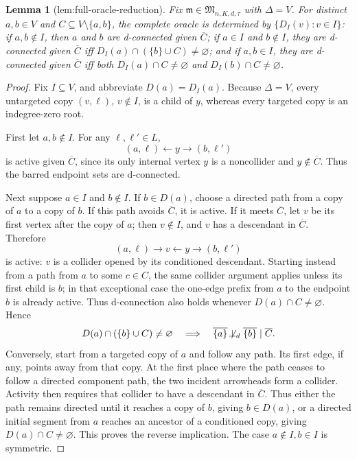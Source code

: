 \documentclass{article}
\newtheorem{lemma}{Lemma}
\begin{document}
\begin{lemma}[lem:full-oracle-reduction]\label{lem:full-oracle-reduction}
Fix \(\mathfrak m\in\mathfrak M_{n,K,d,\tau}\) with \(\Delta=V\). For distinct \(a,b\in V\) and \(C\subseteq V\setminus\{a,b\}\), the complete oracle is determined by \(\{D_I(v):v\in I\}\): if \(a,b\notin I\), then \(a\) and \(b\) are d-connected given \(\overline C\); if \(a\in I\) and \(b\notin I\), they are d-connected given \(\overline C\) iff \(D_I(a)\cap(\{b\}\cup C)\ne\varnothing\); and if \(a,b\in I\), they are d-connected given \(\overline C\) iff both \(D_I(a)\cap C\ne\varnothing\) and \(D_I(b)\cap C\ne\varnothing\).
\end{lemma}
\begin{proof}
Fix \(I\subseteq V\), and abbreviate \(D(a)=D_I(a)\). Because \(\Delta=V\), every untargeted copy \((v,\ell)\), \(v\notin I\), is a child of \(y\), whereas every targeted copy is an indegree-zero root.

First let \(a,b\notin I\). For any \(\ell,\ell'\in L\),
\[
 (a,\ell)\leftarrow y\to(b,\ell')
\]
is active given \(\overline C\), since its only internal vertex \(y\) is a noncollider and \(y\notin\overline C\). Thus the barred endpoint sets are d-connected.

Next suppose \(a\in I\) and \(b\notin I\). If \(b\in D(a)\), choose a directed path from a copy of \(a\) to a copy of \(b\). If this path avoids \(\overline C\), it is active. If it meets \(\overline C\), let \(v\) be its first vertex after the copy of \(a\); then \(v\notin I\), and \(v\) has a descendant in \(\overline C\). Therefore
\[
 (a,\ell)\to v\leftarrow y\to(b,\ell')
\]
is active: \(v\) is a collider opened by its conditioned descendant. Starting instead from a path from \(a\) to some \(c\in C\), the same collider argument applies unless its first child is \(b\); in that exceptional case the one-edge prefix from \(a\) to the endpoint \(b\) is already active. Thus d-connection also holds whenever \(D(a)\cap C\ne\varnothing\). Hence
\[
 D(a)\cap(\{b\}\cup C)\ne\varnothing
 \quad\Longrightarrow\quad
 \overline{\{a\}}\not\!\perp_d\overline{\{b\}}\mid\overline C.
\]
Conversely, start from a targeted copy of \(a\) and follow any path. Its first edge, if any, points away from that copy. At the first place where the path ceases to follow a directed component path, the two incident arrowheads form a collider. Activity then requires that collider to have a descendant in \(\overline C\). Thus either the path remains directed until it reaches a copy of \(b\), giving \(b\in D(a)\), or a directed initial segment from \(a\) reaches an ancestor of a conditioned copy, giving \(D(a)\cap C\ne\varnothing\). This proves the reverse implication. The case \(a\notin I,b\in I\) is symmetric.


\end{proof}
\end{document}
